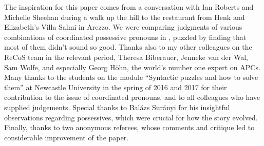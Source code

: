 \documentclass[output=paper]{langsci/langscibook}
\begin{document}
The inspiration for this paper comes from a conversation with Ian Roberts and
Michelle Sheehan during a walk up the hill to the restaurant from Henk and
Elizabeth's Villa Salmi in Arezzo. We were comparing judgments of various
combinations of coordinated possessive pronouns in , puzzled by finding
that most of them didn’t sound so good. Thanks also to my other colleagues on
the ReCoS team in the relevant period, Theresa Biberauer, Jenneke van der Wal,
Sam Wolfe, and especially Georg Höhn, the world's number one expert on APCs.
Many thanks to the students on the module \enquote{Syntactic puzzles and how to
    solve them} at Newcastle University in the spring of 2016 and 2017 for
    their contribution to the issue of coordinated pronouns, and to all
    colleagues who have supplied judgements. Special thanks to Balázs Surányi
    for his insightful observations regarding  possessives, which were
    crucial for how the story evolved. Finally, thanks to two anonymous
    referees, whose comments and critique led to considerable improvement of
    the paper.

{\sloppy
\printbibliography[heading=subbibliography,notkeyword=this]
}
\end{document}
